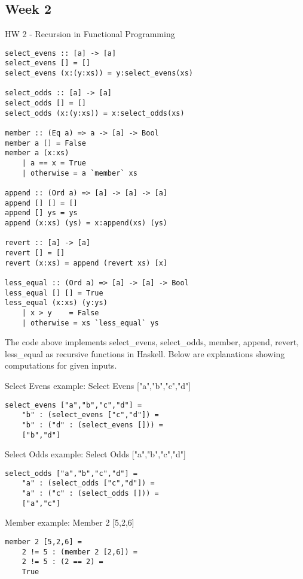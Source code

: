 \documentclass{article}
\theoremstyle{theorem}
\theoremstyle{definition}
\theoremstyle{remark}
\begin{document}
\subsection{Week 2}

HW 2 - Recursion in Functional Programming

\begin{lstlisting}
select_evens :: [a] -> [a]
select_evens [] = []
select_evens (x:(y:xs)) = y:select_evens(xs)

select_odds :: [a] -> [a]
select_odds [] = []
select_odds (x:(y:xs)) = x:select_odds(xs)

member :: (Eq a) => a -> [a] -> Bool
member a [] = False
member a (x:xs)
    | a == x = True
    | otherwise = a `member` xs

append :: (Ord a) => [a] -> [a] -> [a]
append [] [] = []
append [] ys = ys
append (x:xs) (ys) = x:append(xs) (ys)

revert :: [a] -> [a]
revert [] = []
revert (x:xs) = append (revert xs) [x]

less_equal :: (Ord a) => [a] -> [a] -> Bool
less_equal [] [] = True
less_equal (x:xs) (y:ys)
    | x > y    = False
    | otherwise = xs `less_equal` ys
\end{lstlisting}
%

\noindent The code above implements select\_evens, select\_odds, member, append, revert, less\_equal as recursive functions in Haskell. Below are explanations showing computations for given inputs. \newline

\noindent
Select Evens example: 
\newline\newline\indent
Select Evens ["a","b","c","d"]
\begin{lstlisting}
select_evens ["a","b","c","d"] = 
    "b" : (select_evens ["c","d"]) =
    "b" : ("d" : (select_evens [])) =
    ["b","d"]
\end{lstlisting}
%

\noindent
Select Odds example: 
\newline\newline\indent
Select Odds ["a","b","c","d"]
\begin{lstlisting}
select_odds ["a","b","c","d"] = 
    "a" : (select_odds ["c","d"]) =
    "a" : ("c" : (select_odds [])) =
    ["a","c"]
\end{lstlisting}
%

\noindent
Member example: 
\newline\newline\indent
Member 2 [5,2,6]
\begin{lstlisting}
member 2 [5,2,6] = 
    2 != 5 : (member 2 [2,6]) =
    2 != 5 : (2 == 2) =
    True
\end{lstlisting}
%
\end{document}
